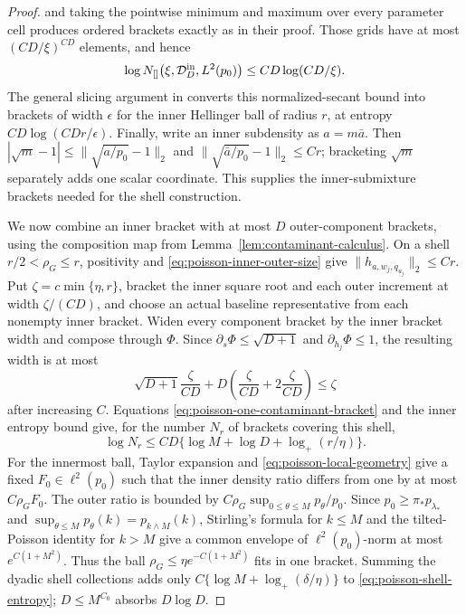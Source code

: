 \documentclass[11pt]{article}
\theoremstyle{definition}
\numberwithin{equation}{section}
\begin{document}
\begin{proof}
and taking the pointwise
minimum and maximum over every parameter cell produces ordered brackets
exactly as in their proof. Those grids have at most \((CD/\xi)^{CD}\)
elements, and hence
\[
 \log N_{[]}\bigl(\xi,\mathcal D_D^{\rm in},L^2(p_0)\bigr)
 \le CD\log(CD/\xi).
\]
The general slicing argument in
\cite[Theorem~2.2]{gassiatVanHandel2014} converts this normalized-secant
bound into brackets of width \(\epsilon\) for the inner Hellinger ball of
radius \(r\), at entropy \(CD\log(CDr/\epsilon)\). Finally, write an inner
subdensity as \(a=m\bar a\). Then
\(|\sqrt m-1|\le\|\sqrt{a/p_0}-1\|_2\) and
\(\|\sqrt{\bar a/p_0}-1\|_2\le Cr\); bracketing \(\sqrt m\) separately
adds one scalar coordinate. This supplies the inner-submixture brackets
needed for the shell construction.

We now combine an inner bracket with at most \(D\) outer-component brackets,
using the composition map from Lemma~\ref{lem:contaminant-calculus}. On a shell
\(r/2<\rho_G\le r\), positivity and
\eqref{eq:poisson-inner-outer-size} give
\(\|h_{a,w_j,q_{u_j}}\|_2\le Cr\). Put
\(\zeta=c\min\{\eta,r\}\), bracket the inner square root and each outer
increment at width \(\zeta/(CD)\), and choose an actual baseline
representative from each nonempty inner bracket. Widen every component bracket
by the inner bracket width and compose through \(\Phi\). Since
\(\partial_s\Phi\le\sqrt{D+1}\) and
\(\partial_{h_j}\Phi\le1\), the resulting width is at most
\[
 \sqrt{D+1}\frac{\zeta}{CD}
 +D\left(\frac{\zeta}{CD}+2\frac{\zeta}{CD}\right)
 \le\zeta
\]
after increasing \(C\). Equations
\eqref{eq:poisson-one-contaminant-bracket} and the inner entropy bound give,
for the number \(N_r\) of brackets covering this shell,
\begin{equation}
\label{eq:poisson-shell-entropy}
 \log N_r\le CD\{\log M+\log D+\log_+(r/\eta)\}.
\end{equation}
For the innermost ball, Taylor expansion and
\eqref{eq:poisson-local-geometry} give a fixed \(F_0\in\ell^2(p_0)\) such
that the inner density ratio differs from one by at most \(C\rho_GF_0\).
The outer ratio is bounded by
\(C\rho_G\sup_{0\le\theta\le M}p_\theta/p_0\). Since
\(p_0\ge\pi_*p_{\lambda_*}\) and
\(\sup_{\theta\le M}p_\theta(k)=p_{k\wedge M}(k)\), Stirling's formula for
\(k\le M\) and the tilted-Poisson identity for \(k>M\) give a common
envelope of \(\ell^2(p_0)\)-norm at most \(e^{C(1+M^2)}\). Thus the ball
\(\rho_G\le\eta e^{-C(1+M^2)}\) fits in one bracket. Summing the dyadic shell
collections adds only \(C\{\log M+\log_+(\delta/\eta)\}\) to
\eqref{eq:poisson-shell-entropy}; \(D\le M^{C_0}\) absorbs \(D\log D\).


\end{proof}
\end{document}
